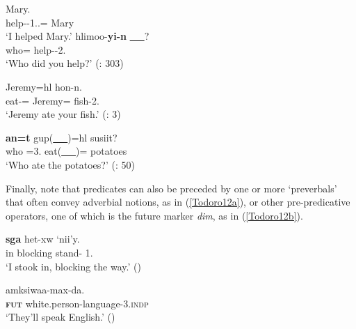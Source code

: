 \documentclass[output=paper]{langscibook}
\begin{document}
\begin{exe}
\ex \label{Todoro10}
\begin{xlist}

\ex \label{Todoro10a}
 Mary. \\
    help-{\tr}-1.{\sg}.{\seriesII}={\pn} Mary \\
\glt `I helped Mary.'  
\ex \label{Todoro10b}
 {hlimoo-\textbf{yi-n}} \uline{~~~}?\\
    who={\cn} help-{\tr}-2{\sg}.{\seriesII} \\
\glt `Who did you help?' (\citealt{rigsby1986a}: 303) 

\end{xlist}
\end{exe}

\begin{exe}
\ex \label{Todoro11}
\begin{xlist}

\ex \label{Todoro11a}
 {Jeremy=hl} {hon-n.} \\
    eat-{\tr}={\cn} Jeremy={\cn} fish-2{\sg}.{\seriesII}\\
\glt `Jeremy ate your fish.' (\citealt{forbes2017a}: 3)

\ex \label{Todoro11b}
 {\textbf{an=t}} {gup(\uline{~~~})=hl} {susiit}? \\
    who {\ax}=3.{\seriesI} eat(\uline{~~~})={\cn} potatoes\\
\glt `Who ate the potatoes?' (\citealt{davis2011a}: 50) 

\end{xlist}
\end{exe}

Finally, note that predicates can also be preceded by one or more ‘preverbals’ that often convey adverbial notions, as in (\ref{Todoro12a}), or other pre-predicative operators, one of which is the future marker \emph{dim}, as in (\ref{Todoro12b}).

\begin{exe}
\ex \label{Todoro12}
\begin{xlist}

\ex \label{Todoro12a}
 {\textbf{sga}} {het-xw} {`nii'y.}\\
    in blocking stand-{\pass} 1{\sg}.{\seriesIII}\\
\glt `I stook in, blocking the way.' (\citealt{rigsby1986a}) 

\ex \label{Todoro12b}
 amksiwaa-max-da. \\
    \textsc{\textbf{fut}} white.person-language-3{\pl}.\textsc{indp}\\
\glt `They'll speak English.' (\citealt{rigsby1986a}) 

\end{xlist}
\end{exe}
\end{document}
